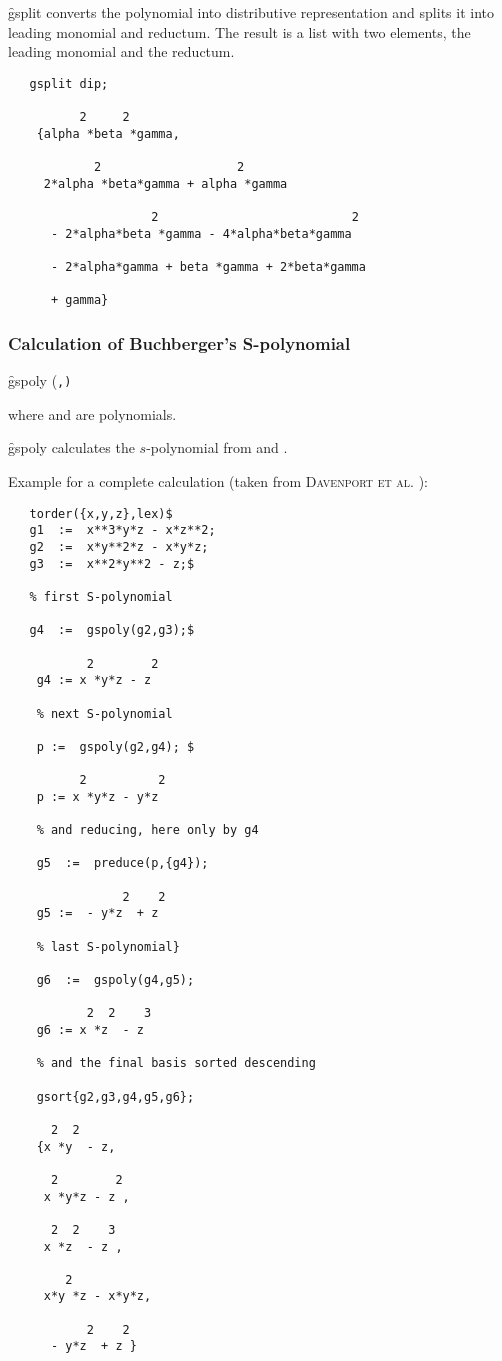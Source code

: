\f{gsplit} converts the polynomial  into distributive representation
and splits it into leading monomial and reductum. The result is a list
with two elements, the leading monomial and the reductum.

\begin{verbatim}
   gsplit dip;

          2     2
    {alpha *beta *gamma,

            2                   2
     2*alpha *beta*gamma + alpha *gamma

                    2                           2
      - 2*alpha*beta *gamma - 4*alpha*beta*gamma

      - 2*alpha*gamma + beta *gamma + 2*beta*gamma

      + gamma}
\end{verbatim}

\subsubsection{Calculation of Buchberger's S-polynomial}
\hypertarget{operator:GSPOLY}{}
\begin{syntax}
  \f{gspoly (}\texttt{,}\texttt{)}
\end{syntax}
where  and  are polynomials.

\f{gspoly} calculates the $s$-polynomial from  and .

Example for a complete calculation (taken from \textsc{Davenport et al.}
\cite{Davenport:88a}):
\begin{verbatim}
   torder({x,y,z},lex)$
   g1  :=  x**3*y*z - x*z**2;
   g2  :=  x*y**2*z - x*y*z;
   g3  :=  x**2*y**2 - z;$

   % first S-polynomial

   g4  :=  gspoly(g2,g3);$

           2        2
    g4 := x *y*z - z

    % next S-polynomial

    p :=  gspoly(g2,g4); $

          2          2
    p := x *y*z - y*z

    % and reducing, here only by g4

    g5  :=  preduce(p,{g4});

                2    2
    g5 :=  - y*z  + z

    % last S-polynomial}

    g6  :=  gspoly(g4,g5);

           2  2    3
    g6 := x *z  - z

    % and the final basis sorted descending

    gsort{g2,g3,g4,g5,g6};

      2  2
    {x *y  - z,

      2        2
     x *y*z - z ,

      2  2    3
     x *z  - z ,

        2
     x*y *z - x*y*z,

           2    2
      - y*z  + z }
\end{verbatim}
